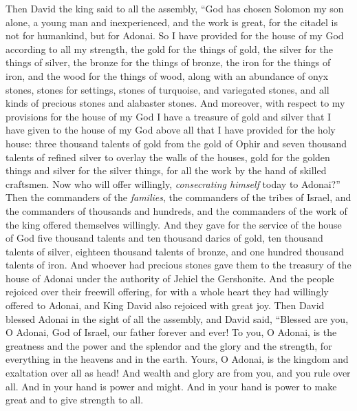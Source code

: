 \begin{biblechapter} %
 Then David the king said to all the assembly, “God has chosen Solomon my son alone, a young man and inexperienced, and the work is great, for the citadel is not for humankind, but for Adonai.
\verse So I have provided for the house of my God according to all my strength, the gold for the things of gold, the silver for the things of silver, the bronze for the things of bronze, the iron for the things of iron, and the wood for the things of wood, along with an abundance of onyx stones, stones for settings, stones of turquoise, and variegated stones, and all kinds of precious stones and alabaster stones.
\verse And moreover, with respect to my provisions for the house of my God I have a treasure of gold and silver that I have given to the house of my God above all that I have provided for the holy house:
\verse three thousand talents of gold from the gold of Ophir and seven thousand talents of refined silver to overlay the walls of the houses,
\verse gold for the golden things and silver for the silver things, for all the work by the hand of skilled craftsmen. Now who will offer willingly, \textit{consecrating himself} today to Adonai?”
\verse Then the commanders of the \textit{families}, the commanders of the tribes of Israel, and the commanders of thousands and hundreds, and the commanders of the work of the king offered themselves willingly.
\verse And they gave for the service of the house of God five thousand talents and ten thousand darics of gold, ten thousand talents of silver, eighteen thousand talents of bronze, and one hundred thousand talents of iron.
\verse And whoever had precious stones gave them to the treasury of the house of Adonai under the authority of Jehiel the Gershonite.
\verse And the people rejoiced over their freewill offering, for with a whole heart they had willingly offered to Adonai, and King David also rejoiced with great joy.
\verse Then David blessed Adonai in the sight of all the assembly, and David said, “Blessed are you, O Adonai, God of Israel, our father forever and ever!
\verse To you, O Adonai, is the greatness and the power and the splendor and the glory and the strength, for everything in the heavens and in the earth. Yours, O Adonai, is the kingdom and exaltation over all as head!
\verse And wealth and glory are from you, and you rule over all. And in your hand is power and might. And in your hand is power to make great and to give strength to all.

\end{biblechapter}
